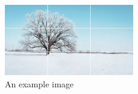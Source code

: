 \documentclass{article}
\begin{document}
\lipsum[1-7]
\begin{figure}[H]
\centering
\includegraphics[width=0.5\textwidth]{example-image}
\caption{An example image}
\end{figure}
\lipsum[8-15]
\end{document}
